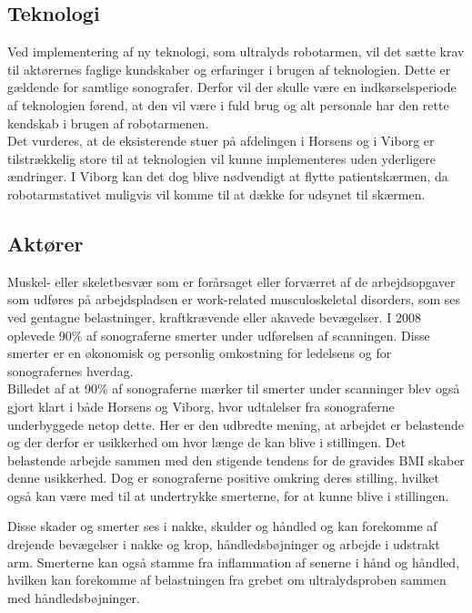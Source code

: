 \subsection{Teknologi}
Ved implementering af ny teknologi, som ultralyds robotarmen, vil det sætte krav til aktørernes faglige kundskaber og erfaringer i brugen af teknologien. Dette er gældende for samtlige sonografer. Derfor vil der skulle være en indkørselsperiode af teknologien førend, at den vil være i fuld brug og alt personale har den rette kendskab i brugen af robotarmenen. \\
Det vurderes, at de eksisterende stuer på afdelingen i Horsens og i Viborg er tilstrækkelig store til at teknologien vil kunne implementeres uden yderligere ændringer. I Viborg kan det dog blive nødvendigt at flytte patientskærmen, da robotarmstativet muligvis vil komme til at dække for udsynet til skærmen.  

\subsection{Aktører}
Muskel- eller skeletbesvær som er forårsaget eller forværret af de arbejdsopgaver som udføres på arbejdspladsen er work-related musculoskeletal disorders, som ses ved gentagne belastninger, kraftkrævende eller akavede bevægelser. I 2008 oplevede 90\% af sonograferne smerter under udførelsen af scanningen. Disse smerter er en økonomisk og personlig omkostning for ledelsens og for sonografernes hverdag. \cite{31}\cite{30}\\
Billedet af at 90\% af sonograferne mærker til smerter under scanninger blev også gjort klart i både Horsens og Viborg, hvor udtalelser fra sonograferne underbyggede netop dette. Her er den udbredte mening, at arbejdet er belastende og der derfor er usikkerhed om hvor længe de kan blive i stillingen. Det belastende arbejde sammen med den stigende tendens for de gravides BMI skaber denne usikkerhed. Dog er sonograferne positive omkring deres stilling, hvilket også kan være med til at undertrykke smerterne, for at kunne blive i stillingen.

Disse skader og smerter ses i nakke, skulder og håndled og kan forekomme af drejende bevægelser i nakke og krop, håndledsbøjninger og arbejde i udstrakt arm. Smerterne kan også stamme fra inflammation af senerne i hånd og håndled, hvilken kan forekomme af belastningen fra grebet om ultralydsproben sammen med håndledsbøjninger. \cite{31}

